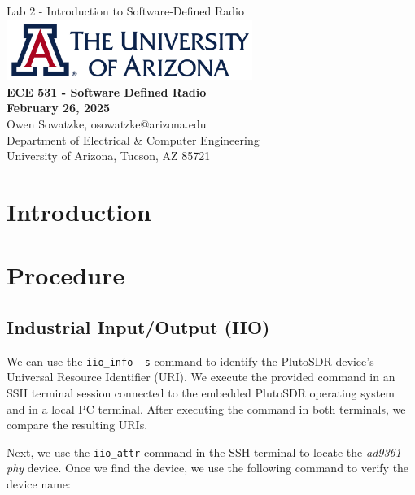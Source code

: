\documentclass{article}
\begin{document}
\begin{titlepage}
	\centering
	{\huge Lab 2 - Introduction to Software-Defined Radio}\\[0.25 in]
	\includegraphics[width=0.6\textwidth]{ua_logo.png}\\[0.25 in]
	{\large \textbf{ECE 531 - Software Defined Radio\\[0.25 in]
	February 26, 2025\\[0.25 in]}}
	{\large Owen Sowatzke, osowatzke@arizona.edu\\[0.05 in]
	Department of Electrical \& Computer Engineering\\[0.05 in]
	University of Arizona, Tucson, AZ 85721\\[0.5 in]}
	\hypersetup{linkcolor=navy-blue}
	\noindent\hrulefill
	\tableofcontents
	\noindent\hrulefill
\end{titlepage}

\setlength{\parindent}{0pt}

\section{Introduction}

\section{Procedure}

\subsection{Industrial Input/Output (IIO)}
\label{section::industrial_input_output}

We can use the \texttt{iio\_info -s} command to identify the PlutoSDR device's Universal Resource Identifier (URI). We execute the provided command in an SSH terminal session connected to the embedded PlutoSDR operating system and in a local PC terminal. After executing the command in both terminals, we compare the resulting URIs.

Next, we use the \texttt{iio\_attr} command in the SSH terminal to locate the \textit{ad9361-phy} device. Once we find the device, we use the following command to verify the device name:
\end{document}
